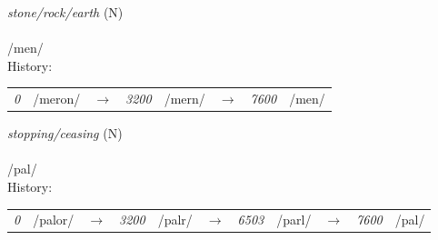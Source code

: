 \vspace{15pt}
\begin{nopagebreak}
 \textit{stone/rock/earth} (N)\\
\\
\noindent /m{\textprimstress}en/\\


\noindent History:

\vspace{-0pt}
\hspace{40pt}
\begin{tabular}{ccc}
\textit{0} & /meron/&$\rightarrow$ & \textit{3200} & /mern/&$\rightarrow$ & \textit{7600} & /men/& \\
\end{tabular}

\vspace{20pt}\hline

\end{nopagebreak}
\filbreak



\vspace{15pt}
\begin{nopagebreak}
 \textit{stopping/ceasing} (N)\\
\\
\noindent /p{\textprimstress}al/\\


\noindent History:

\vspace{-0pt}
\hspace{40pt}
\begin{tabular}{ccc}
\textit{0} & /palor/&$\rightarrow$ & \textit{3200} & /palr/&$\rightarrow$ & \textit{6503} & /parl/&$\rightarrow$ & \textit{7600} & /pal/& \\
\end{tabular}

\vspace{20pt}\hline

\end{nopagebreak}
\filbreak



